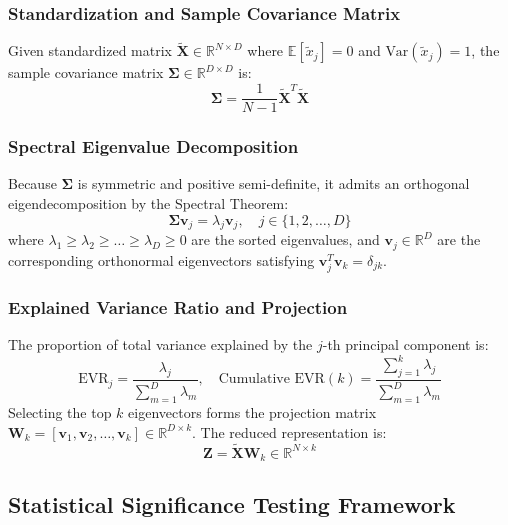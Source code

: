 \documentclass[12pt,a4paper]{article}
\begin{document}
\subsubsection{Standardization and Sample Covariance Matrix}
Given standardized matrix $\tilde{\mathbf{X}} \in \mathbb{R}^{N \times D}$ where $\mathbb{E}[\tilde{x}_j] = 0$ and $\text{Var}(\tilde{x}_j) = 1$, the sample covariance matrix $\mathbf{\Sigma} \in \mathbb{R}^{D \times D}$ is:
\begin{equation}
\mathbf{\Sigma} = \frac{1}{N - 1} \tilde{\mathbf{X}}^T \tilde{\mathbf{X}}
\end{equation}

\subsubsection{Spectral Eigenvalue Decomposition}
Because $\mathbf{\Sigma}$ is symmetric and positive semi-definite, it admits an orthogonal eigendecomposition by the Spectral Theorem:
\begin{equation}
\mathbf{\Sigma} \mathbf{v}_j = \lambda_j \mathbf{v}_j, \quad j \in \{1, 2, \dots, D\}
\end{equation}
where $\lambda_1 \ge \lambda_2 \ge \dots \ge \lambda_D \ge 0$ are the sorted eigenvalues, and $\mathbf{v}_j \in \mathbb{R}^D$ are the corresponding orthonormal eigenvectors satisfying $\mathbf{v}_j^T \mathbf{v}_k = \delta_{jk}$.

\subsubsection{Explained Variance Ratio and Projection}
The proportion of total variance explained by the $j$-th principal component is:
\begin{equation}
\text{EVR}_j = \frac{\lambda_j}{\sum_{m=1}^D \lambda_m}, \quad \text{Cumulative EVR}(k) = \frac{\sum_{j=1}^k \lambda_j}{\sum_{m=1}^D \lambda_m}
\end{equation}
Selecting the top $k$ eigenvectors forms the projection matrix $\mathbf{W}_k = [\mathbf{v}_1, \mathbf{v}_2, \dots, \mathbf{v}_k] \in \mathbb{R}^{D \times k}$. The reduced representation is:
\begin{equation}
\mathbf{Z} = \tilde{\mathbf{X}} \mathbf{W}_k \in \mathbb{R}^{N \times k}
\end{equation}

\subsection{Statistical Significance Testing Framework}
\end{document}

